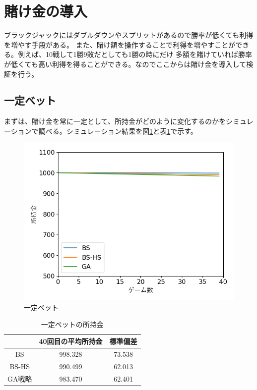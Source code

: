 \section{賭け金の導入}
ブラックジャックにはダブルダウンやスプリットがあるので勝率が低くても利得を増やす手段がある。
また、賭け額を操作することで利得を増やすことができる。例えば、10戦して1勝9敗だとしても1勝の時にだけ
多額を賭けていれば勝率が低くても高い利得を得ることができる。なのでここからは賭け金を導入して検証を行う。

\subsection{一定ベット}
まずは、賭け金を常に一定として、所持金がどのように変化するのかをシミュレーションで調べる。シミュレーション結果を図\ref{betdife}と表\ref{bet}で示す。
\begin{figure}[H]
 \begin{center} 
  \includegraphics[width=0.7\linewidth]{./figure/bet-defineite-ver5}
  \caption{一定ベット\label{betdife}}
 \end{center}
\end{figure}

\begin{table}[H]
 \caption{一定ベットの所持金\label{bet}}
 \begin{center}
  \begin{tabular}{|c|c|c|}
  \hline  & 40回目の平均所持金 & 標準偏差 \\
  \hline BS & 998.328 & 73.538\\
  \hline BS-HS & 990.499 & 62.013 \\
  \hline GA戦略 & 983.470 & 62.401\\
  \hline
  \end{tabular}
 \end{center}
\end{table}

